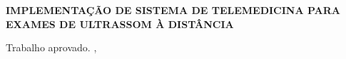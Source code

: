 \begin{folhadeaprovacao}

  \begin{center}
    {\ABNTEXchapterfont\large\imprimirautor}

    \vspace*{\fill}\vspace*{\fill}
    {\ABNTEXchapterfont\bfseries\Large IMPLEMENTAÇÃO DE SISTEMA DE TELEMEDICINA PARA EXAMES DE ULTRASSOM À DISTÂNCIA}
    \vspace*{\fill}
    
        \imprimirpreambulo
  
   Trabalho aprovado. \imprimirlocal, \imprimirdatadaaprovacao
  \end{center}

   
      
   \begin{center}
    \vspace*{0.5cm}
    {\large\imprimirlocal}
    \par
    {\large\imprimirdata}
    \vspace*{1cm}
  \end{center}
  
\end{folhadeaprovacao}
